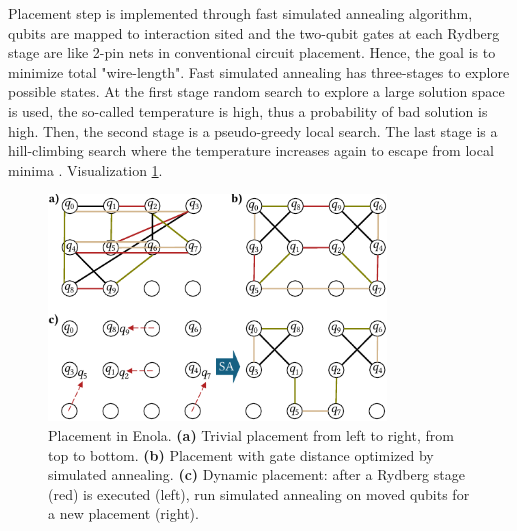 Placement step is implemented through fast simulated annealing algorithm, 
qubits are mapped to interaction sited and the two-qubit
gates at each Rydberg stage are like 2-pin nets in conventional
circuit placement. Hence, the goal is to minimize total "wire-length".
Fast simulated annealing has three-stages to explore possible states.
At the first stage random search to explore a large solution space is used, the so-called temperature is high, 
thus a probability of bad solution is high.
Then, the second stage is a pseudo-greedy local search. 
The last stage is a hill-climbing search where
the temperature increases again to escape from local minima \parencite{Tan_2025_Enola}. 
Visualization \ref{fig:placement_Enola}.
\begin{figure}[htbp]
  \centering
    \includegraphics[width=0.8\textwidth]{figures/placement_Enola.pdf}
    \caption[Placement in Enola]{ Placement in Enola. 
    \textbf{(a)} Trivial placement from left to right, from top to bottom. 
    \textbf{(b)} Placement with gate distance optimized by simulated annealing. 
    \textbf{(c)} Dynamic placement: after a Rydberg stage (red) is executed (left), run simulated
    annealing on moved qubits for a new placement (right). \parencite{Tan_2025_Enola}}
    \label{fig:placement_Enola}
\end{figure}

